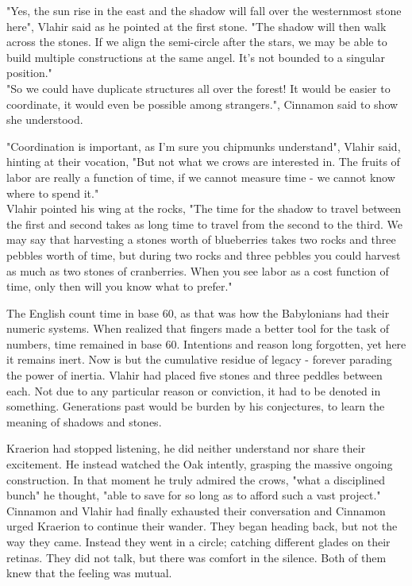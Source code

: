 \documentclass[smalldemyvopaper,11pt,twoside,onecolumn,openright,extrafontsizes]{memoir}
\begin{document}
"Yes, the sun rise in the east and the shadow will fall over the westernmost stone here", Vlahir said as he pointed at the first stone. "The shadow will then walk across the stones. If we align the semi-circle after the stars, we may be able to build multiple constructions at the same angel. It's not bounded to a singular position."\\

"So we could have duplicate structures all over the forest! It would be easier to coordinate, it would even be possible among strangers.", Cinnamon said to show she understood. 

"Coordination is important, as I'm sure you chipmunks understand", Vlahir said, hinting at their vocation, "But not what we crows are interested in. The fruits of labor are really a function of time, if we cannot measure time - we cannot know where to spend it." \\ 

Vlahir pointed his wing at the rocks, "The time for the shadow to travel between the first and second takes as long time to travel from the second to the third. We may say that harvesting a stones worth of blueberries takes two rocks and three pebbles worth of time, but during two rocks and three pebbles you could harvest as much as two stones of cranberries. When you see labor as a cost function of time, only then will you know what to prefer."

The English count time in base 60, as that was how the Babylonians had their numeric systems. When realized that fingers made a better tool for the task of numbers, time remained in base 60. Intentions and reason long forgotten, yet here it remains inert. Now is but the cumulative residue of legacy - forever parading the power of inertia. Vlahir had placed five stones and three peddles between each. Not due to any particular reason or conviction, it had to be denoted in something. Generations past would be burden by his conjectures, to learn the meaning of shadows and stones. 

Kraerion had stopped listening, he did neither understand nor share their excitement. He instead watched the Oak intently, grasping the massive ongoing construction. In that moment he truly admired the crows, "what a disciplined bunch" he thought, "able to save for so long as to afford such a vast project." \\

Cinnamon and Vlahir had finally exhausted their conversation and Cinnamon urged Kraerion to continue their wander. They began heading back, but not the way they came. Instead they went in a circle; catching different glades on their retinas. They did not talk, but there was comfort in the silence. Both of them knew that the feeling was mutual. \\
\end{document}
